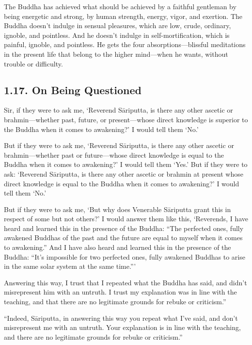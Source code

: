 \documentclass[12pt,openany]{book}%
\begin{document}
The Buddha has achieved what should be achieved by a faithful gentleman by being energetic and strong, by human strength, energy, vigor, and exertion. The Buddha doesn’t indulge in sensual pleasures, which are low, crude, ordinary, ignoble, and pointless. And he doesn’t indulge in self-mortification, which is painful, ignoble, and pointless. He gets the four absorptions—blissful meditations in the present life that belong to the higher mind—when he wants, without trouble or difficulty. 

\subsection*{1.17. On Being Questioned }

Sir, if they were to ask me, ‘Reverend \textsanskrit{Sāriputta}, is there any other ascetic or brahmin—whether past, future, or present—whose direct knowledge is superior to the Buddha when it comes to awakening?’ I would tell them ‘No.’ 

But if they were to ask me, ‘Reverend \textsanskrit{Sāriputta}, is there any other ascetic or brahmin—whether past or future—whose direct knowledge is equal to the Buddha when it comes to awakening?’ I would tell them ‘Yes.’ But if they were to ask: ‘Reverend \textsanskrit{Sāriputta}, is there any other ascetic or brahmin at present whose direct knowledge is equal to the Buddha when it comes to awakening?’ I would tell them ‘No.’ 

But if they were to ask me, ‘But why does Venerable \textsanskrit{Sāriputta} grant this in respect of some but not others?’ I would answer them like this, ‘Reverends, I have heard and learned this in the presence of the Buddha: “The perfected ones, fully awakened Buddhas of the past and the future are equal to myself when it comes to awakening.” And I have also heard and learned this in the presence of the Buddha: “It’s impossible for two perfected ones, fully awakened Buddhas to arise in the same solar system at the same time.”’ 

Answering this way, I trust that I repeated what the Buddha has said, and didn’t misrepresent him with an untruth. I trust my explanation was in line with the teaching, and that there are no legitimate grounds for rebuke or criticism.” 

“Indeed, \textsanskrit{Sāriputta}, in answering this way you repeat what I’ve said, and don’t misrepresent me with an untruth. Your explanation is in line with the teaching, and there are no legitimate grounds for rebuke or criticism.” 
\end{document}
